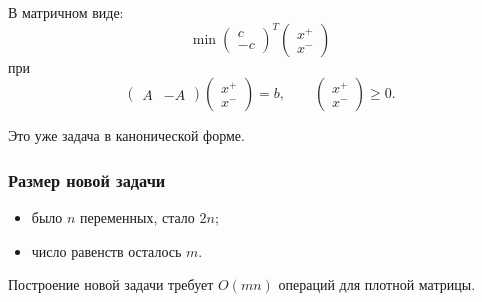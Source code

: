 	В матричном виде:
	\[
	\min
	\begin{pmatrix}
		c\\
		-c
	\end{pmatrix}^T
	\begin{pmatrix}
		x^+\\
		x^-
	\end{pmatrix}
	\]
	при
	\[
	\begin{pmatrix}
		A & -A
	\end{pmatrix}
	\begin{pmatrix}
		x^+\\
		x^-
	\end{pmatrix}
	=b,
	\qquad
	\begin{pmatrix}
		x^+\\
		x^-
	\end{pmatrix}
	\ge 0.
	\]
	
	Это уже задача в канонической форме.
	
	\subsubsection*{Размер новой задачи}
	\begin{itemize}
		\item было \(n\) переменных, стало \(2n\);
		\item число равенств осталось \(m\).
	\end{itemize}
	
	Построение новой задачи требует \(O(mn)\) операций для плотной матрицы.
	
	
